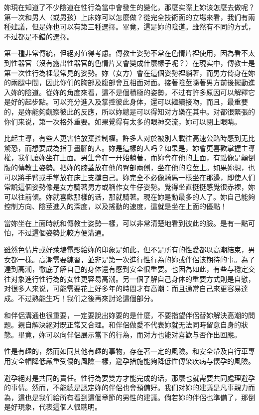 \documentclass[12pt,UTF8]{ctexbook}
\begin{document}
妳現在知道了不少陰道在性行為當中會發生的變化，那麼实際上妳该怎麼去做呢？第一次和男人（或男孩）上床妳可以怎麼做？從完全技術面的立場來看，我们有兩種建議，但是妳也可以有第三種選擇。畢竟，這是妳的陰道。雖然有不同的方式，不过都是不錯的選擇。

第一種非常傳統，但絕对值得考慮。傳教士姿勢不常在色情片裡使用，因為看不太到性器官（沒有露出性器官的色情片又會變成什麼樣子呢？）在現实中，傳教士是第一次性行為裡最常見的姿勢。妳（女方）會在這個姿勢裡躺著，而男方倚身在妳的兩腿中間，因此你们的胸部及腹部會互相面对面。接著陰莖隨著男方前後擺動進入妳的陰道。從妳的角度來看，這不是個積極的姿勢，不过有許多原因可以解釋它是好的起步點。可以充分進入及掌控彼此身体，還可以繼續接吻，而且，最重要的，是妳能夠觀察彼此的反應，所以妳總是可以得知对方樂在其中。对都很緊張的你们来说，第一次格外重要。如果覺得有太多的眼神交流，妳可以閉上眼睛。

比起主導，有些人更害怕放棄控制權。許多人对於被別人載往高速公路時感到无比驚恐，而想要成為指手畫腳的人。妳是這樣的人吗？如果是，妳會更喜歡掌握主導權，我们讓妳坐在上面。男生會在一开始躺著，而妳會在他的上面，有點像是顛倒版的傳教士姿勢。把妳的膝蓋放在他的臀部兩側，坐在他的陰莖上。如果妳想，也可以將手臂或手掌放在床上支撐自己。妳完全不必像騎馬一樣坐在那邊，即使人们常說這個姿勢像是女方騎著男方或稱作女牛仔姿勢。覺得坐直挺挺感覺很赤裸，妳可以往前傾。妳就喜歡那樣的话，那就騎著。現在妳是動最多的人了。妳自己能夠控制方向、陰莖進入的深度，以及搖動的速度，這就是坐在上面的優點！

當妳坐在上面時就和傳教士姿勢一樣，可以非常清楚地看到彼此的臉。是有一點可怕，不过這個姿勢比較方便溝通。

雖然色情片或好萊塢電影給妳的印象是如此，但不是所有的性愛都以高潮結束，男女都一樣。高潮需要練習，並非是第一次進行性行為的妳或伴侶该期待的事。為了達到高潮，徹底了解自己的身体還有感到安全很重要。也因為如此，有些与穩定交往对象進行性行為的女性更容易高潮。另一個了解自己身体的重要方式則是自慰，对很多人来说，可能需要花上好多年的時間才有高潮：而且通常自己來更容易達成。不过熟能生巧！我们之後再來討论這個部分。

和伴侶溝通也很重要，一定要說出妳要的是什麼，不要指望伴侶替妳解決高潮的問題。親自解決絕对既正常又合理。和伴侶做愛不代表妳就无法同時留意自身的狀態。畢竟，妳可以向伴侶展示當下的行為，而对方也能对喜歡与否作出回應。

性是有趣的，然而如同其他有趣的事物，存在著一定的風險。和安全帶及自行車專用安全帽降低嚴重受傷的風險一樣，避孕措施能夠降低性傳染疾病与懷孕的風險。

避孕絕对是共同的責任。性行為要雙方才能完成的话，那麼也就需要共同處理避孕的事情。然而，不能總是認定妳的伴侶也會預備好。我们对妳的建議是凡事親力而為，這也是我们給所有看到這個章節的男性的建議。倘若妳的伴侶也準備了，那倒是好現象，代表這個人很聰明。
\end{document}
